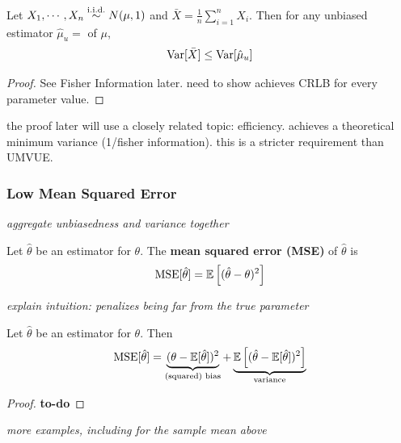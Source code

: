 \documentclass[../../../main.tex]{subfiles}
\begin{document}
\begin{proposition}
    Let $X_1,\cdots,X_n\overset{\mathrm{i.i.d.}}{\sim} N(\mu,1)$ and $\bar X=\frac{1}{n}\sum_{i=1}^n X_i$. 
    Then for any unbiased estimator $\hat \mu_u=$ of $\mu$,
    \begin{equation*}
        \operatorname{Var}[\bar X]\leq \operatorname{Var}[\hat \mu_u]
    \end{equation*}
    \begin{proof}
        See Fisher Information later. need to show achieves CRLB for every parameter value.
    \end{proof}
\end{proposition}

the proof later will use a closely related topic: efficiency. 
achieves a theoretical minimum variance (1/fisher information).
this is a stricter requirement than UMVUE.

\subsubsection{Low Mean Squared Error}

\textit{aggregate unbiasedness and variance together}

\begin{definition}
    Let $\hat \theta$ be an estimator for $\theta$. The \textbf{mean squared error (MSE)} of $\hat \theta$ is
    \begin{equation*}
        \operatorname{MSE}[\hat \theta]=\mathbb{E}\left[(\hat \theta-\theta)^2\right]
    \end{equation*}
\end{definition}

\textit{explain intuition: penalizes being far from the true parameter}

\begin{proposition}
    Let $\hat \theta$ be an estimator for $\theta$. Then
    \begin{equation*}
        \operatorname{MSE}[\hat \theta]=\underbrace{(\theta-\mathbb{E}[\hat \theta])^2}_{\textrm{(squared) bias}}+\underbrace{\mathbb{E}\left[(\hat \theta-\mathbb{E}[\hat \theta])^2\right]}_{\textrm{variance}}
    \end{equation*}
    \begin{proof}
        \textbf{to-do}
    \end{proof}
\end{proposition}

\textit{more examples, including for the sample mean above}
\end{document}
